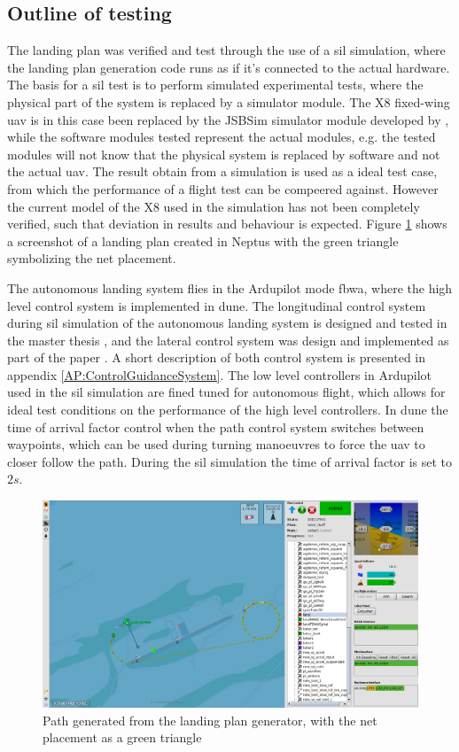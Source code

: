 \subsection{Outline of testing}\label{ss:SILOutline}
The landing plan was verified and test through the use of a \gls{sil} simulation, where the landing plan generation code runs as if it's connected to the actual hardware. The basis for a \gls{sil} test is to perform simulated experimental tests, where the physical part of the system is replaced by a simulator module.  The X8 fixed-wing \gls{uav} is in this case been replaced by the JSBSim simulator module developed by \citep{Gryte}, while the software modules tested represent the actual modules, e.g. the tested modules will not know that the physical system is replaced by software and not the actual \gls{uav}. The result obtain from a simulation is used as a ideal test case, from which the performance of a flight test can be compeered against. However the current model of the X8 used in the simulation has not been completely verified, such that deviation in results and behaviour is expected. Figure \ref{Fig:LandingPathNeptus} shows a screenshot of a landing plan created in Neptus with the green triangle symbolizing the net placement.

The autonomous landing system flies in the Ardupilot mode \gls{fbwa}, where the high level control system is implemented in \gls{dune}. The longitudinal control system during \gls{sil} simulation of the autonomous landing system is designed and tested in the master thesis \citep{Sigurd}, and the lateral control system was design and implemented as part of the paper \citep{fortuna2015cascaded}. A short description of both control system is presented in appendix \ref{AP:ControlGuidanceSystem}. The low level controllers in Ardupilot used in the \gls{sil} simulation are fined tuned for autonomous flight, which allows for ideal test conditions on the performance of the high level controllers. In \gls{dune} the time of arrival factor control when the path control system switches between waypoints, which can be used during turning manoeuvres to force the \gls{uav} to closer follow the path. During the \gls{sil} simulation the time of arrival factor is set to $2 s$.
\begin{figure}[H]
\centering
\includegraphics[scale=0.25]{figs/LandingPathNeptus.png}
\caption{Path generated from the landing plan generator, with the net placement as a green triangle}
\label{Fig:LandingPathNeptus}
\end{figure}
